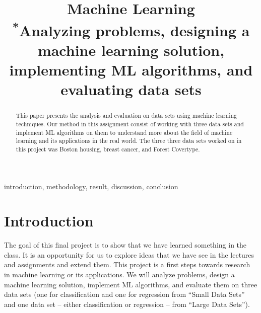 \documentclass[conference]{IEEEtran}
\begin{document}
\title{Machine Learning\\
{\footnotesize \textsuperscript{*}Analyzing problems, designing a machine learning solution, implementing ML algorithms, and evaluating  data sets }
}

\author{
\and
{}
\and
{}
\and
{}
}

\maketitle


\begin{abstract}
This paper presents the analysis and evaluation on data sets using machine learning techniques. Our method in this assignment consist of working with three data sets and implement ML algorithms on them to understand more about the field of machine learning and its applications in the real world. The three three data sets worked on in this project was  Boston housing, breast cancer, and Forest Covertype.
\end{abstract}

\begin{IEEEkeywords}
introduction, methodology, result, discussion, conclusion
\end{IEEEkeywords}


\section{Introduction}
The goal of this final project is to show that we have learned something in the class. It is an opportunity for us to explore ideas that we have see in the lectures and assignments and extend them. This project is a first steps towards research in machine learning or its applications. We will analyze problems, design a machine learning solution, implement ML algorithms, and evaluate them on three data sets (one for classification and one for regression from “Small Data Sets” and one data set – either classification or regression – from “Large Data Sets”).
\end{document}
